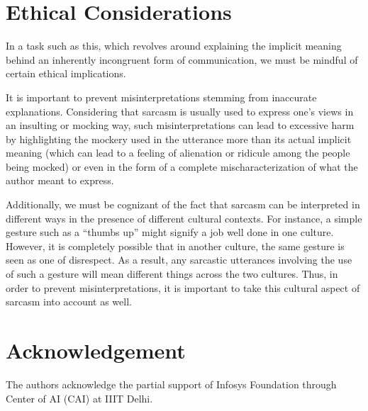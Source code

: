 \section{Ethical Considerations} \label{sec:ethical}
In a task such as this, which revolves around explaining the implicit meaning behind an inherently incongruent form of communication, we must be mindful of certain ethical implications. 

It is important to prevent misinterpretations stemming from inaccurate explanations. Considering that sarcasm is usually used to express one's views in an insulting or mocking way, such misinterpretations can lead to excessive harm by highlighting the mockery used in the utterance more than its actual implicit meaning (which can lead to a feeling of alienation or ridicule among the people being mocked) or even in the form of a complete mischaracterization of what the author meant to express. 

Additionally, we must be cognizant of the fact that sarcasm can be interpreted in different ways in the presence of different cultural contexts. For instance, a simple gesture such as a ``thumbs up'' might signify a job well done in one culture. However, it is completely possible that in another culture, the same gesture is seen as one of disrespect. As a result, any sarcastic utterances involving the use of such a gesture will mean different things across the two cultures. Thus, in order to prevent misinterpretations, it is important to take this cultural aspect of sarcasm into account as well.

\section*{Acknowledgement}
The authors acknowledge the partial support of Infosys Foundation through Center of AI (CAI) at IIIT Delhi.